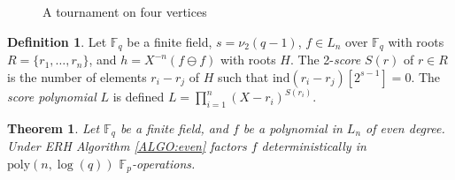 \documentclass{article}
\newcounter{dummy} \numberwithin{dummy}{section}
\theoremstyle{plain}
\newtheorem{thm}[dummy]{Theorem}
\theoremstyle{definition}
\newtheorem{mydef}[dummy]{Definition}
\def\Fp {{ \mathbb{F} _ {p} }}
\def\Fq {{ \mathbb{F} _ {q} }}
\def\ind {{ \mathrm{ind} }}
\def\poly {{ \mathrm{poly} }}
\begin{document}
		\begin{center}
		    \begin{figure}
				\label{FIG:polyTourn}
				 
				\caption{A tournament on four vertices} 
				\end{figure}
		\end{center}
		
		\begin{mydef}
		\label{DEF:score}
		    Let $\Fq$ be a finite field, $s=\nu_2(q-1)$, $f \in L_n$ over $\Fq$ with roots $R=\{r_1,\ldots,r_n \}$, and $h=X^{-n}(f \ominus f)$ with roots $H$. The 2-\emph{score} $S(r)$ of $r \in R$ is the number of elements $r_i-r_j$ of $H$ such that $\ind(r_i-r_j)[2^{s-1}]=0$. The \emph{score polynomial} $L$ is defined $L=\prod_{i=1}^n{(X-r_i)^{S(r_i)}}.$
		\end{mydef}
		
		\begin{thm} 
		\label{THM:even}
		    Let $\Fq$ be a finite field, and $f$ be a polynomial in $L_n$ of even degree. Under ERH Algorithm \ref{ALGO:even} factors $f$ deterministically in $\poly(n,\log(q))$ $\Fp$-operations.
		\end{thm}
		
\end{document}
